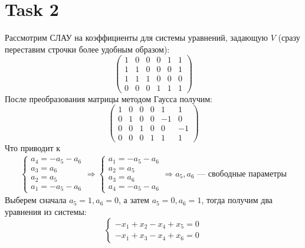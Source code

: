 \section{Task 2}
Рассмотрим СЛАУ на коэффициенты для системы уравнений, задающую $V$ (сразу переставим строчки более удобным образом):
\begin{equation}
    \begin{pmatrix}
        1 & 0 & 0 & 0 & 1 & 1 \\
        1 & 1 & 0 & 0 & 0 & 1 \\
        1 & 1 & 1 & 0 & 0 & 0 \\
        0 & 0 & 0 & 1 & 1 & 1
    \end{pmatrix}
\end{equation}
После преобразования матрицы методом Гаусса получим:
\begin{equation}
    \begin{pmatrix}
        1 & 0 & 0 & 0 &  1 & 1 \\
        0 & 1 & 0 & 0 & -1 & 0 \\
        0 & 0 & 1 & 0 &  0 & -1 \\
        0 & 0 & 0 & 1 &  1 & 1
    \end{pmatrix}
\end{equation}
Что приводит к
\begin{gather}
    \begin{cases}
        a_4 = -a_5 - a_6 \\
        a_3 = a_6 \\
        a_2 = a_5 \\
        a_1 = -a_5 - a_6
    \end{cases} \Longrightarrow
    \begin{cases}
        a_1 = -a_5 - a_6 \\
        a_2 = a_5 \\
        a_3 = a_6 \\
        a_4 = -a_5 - a_6
    \end{cases} \Longrightarrow a_5, a_6 \text{ --- свободные параметры}
\end{gather}
Выберем сначала $a_5 = 1, a_6 = 0$, а затем $a_5 = 0, a_6 = 1$, тогда получим два уравнения из системы:
\begin{equation}
    \begin{cases}
        -x_1 + x_2 - x_4 + x_5 = 0 \\
        -x_1 + x_3 - x_4 + x_6 = 0
    \end{cases}
\end{equation}
